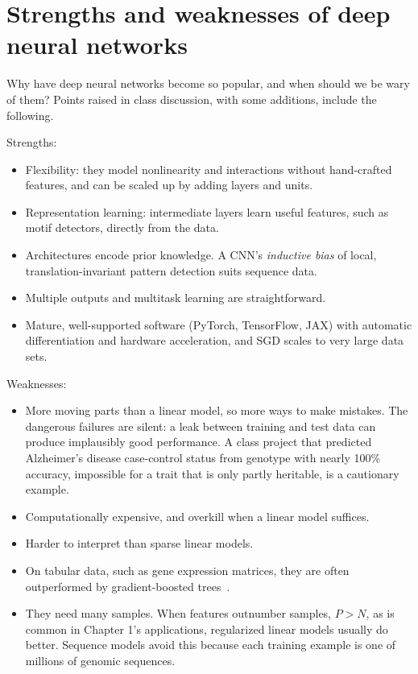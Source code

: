\section{Strengths and weaknesses of deep neural networks}

Why have deep neural networks become so popular, and when should we be wary of them? Points raised in class discussion, with some additions, include the following.

Strengths:
\begin{itemize}
  \item Flexibility: they model nonlinearity and interactions without hand-crafted features, and can be scaled up by adding layers and units.
  \item Representation learning: intermediate layers learn useful features, such as motif detectors, directly from the data.
  \item Architectures encode prior knowledge. A CNN's \emph{inductive bias} of local, translation-invariant pattern detection suits sequence data.
  \item Multiple outputs and multitask learning are straightforward.
  \item Mature, well-supported software (PyTorch, TensorFlow, JAX) with automatic differentiation and hardware acceleration, and SGD scales to very large data sets.
\end{itemize}
Weaknesses:
\begin{itemize}
  \item More moving parts than a linear model, so more ways to make mistakes. The dangerous failures are silent: a leak between training and test data can produce implausibly good performance. A class project that predicted Alzheimer's disease case-control status from genotype with nearly 100\% accuracy, impossible for a trait that is only partly heritable, is a cautionary example.
  \item Computationally expensive, and overkill when a linear model suffices.
  \item Harder to interpret than sparse linear models.
  \item On tabular data, such as gene expression matrices, they are often outperformed by gradient-boosted trees~\citep{grinsztajn2022}.
  \item They need many samples. When features outnumber samples, $P>N$, as is common in Chapter 1's applications, regularized linear models usually do better. Sequence models avoid this because each training example is one of millions of genomic sequences.
\end{itemize}

